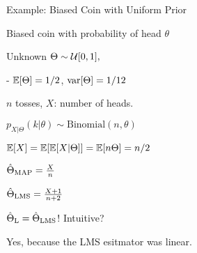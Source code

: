 \begin{frame}{Example: Biased Coin with Uniform Prior}

{
\small
\plitemsep 0.05in
\bci
\item Biased coin with probability of head $\theta$
\item Unknown $\Theta \sim \mathcal U[0,1],$

- $\mathbb{E}[ \Theta ] = 1/2$, $\text{var}[ \Theta ] = 1/12$
\item $n$ tosses, $X$: number of heads.
\item $p_{X|\Theta}(k|\theta) \sim \text{Binomial}(n,\theta)$
\item<2-> $\mathbb{E}[ X ] = \mathbb{E}[ \mathbb{E}[ X|\Theta ] ] = \mathbb{E}[ n\Theta ] = n/2$
\eci
}
{

\small
{}


\vspace{-0.3cm}
\plitemsep 0.03in
\bci
\item<8-> $\hat{\Theta}_{\text{MAP}} = \frac{X}{n}$
\item<8-> $\hat{\Theta}_{\text{LMS}}= \frac{X+1}{n+2}$
\item<9-> $\hat{\Theta}_{\text{L}} = \hat{\Theta}_{\text{LMS}}$! Intuitive?
\item<10-> Yes, because the LMS esitmator was linear.
  \eci

  }
\end{frame}










